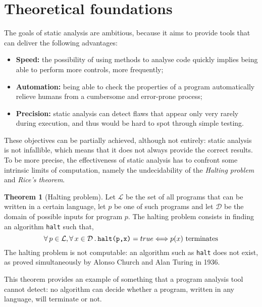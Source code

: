 \documentclass[12pt,a4paper]{book}
\newcommand{\st}{\hspace{2px}.\hspace{2px}}
\theoremstyle{definition}
\begin{document}
	\section{Theoretical foundations}
	The goals of static analysis are ambitious, because it aims to provide tools that can deliver the following advantages:
	\begin{itemize}
		\item \textbf{Speed:} the possibility of using methods to analyse code quickly implies being able to perform more controls, more frequently; 
		\item \textbf{Automation:} being able to check the properties of a program automatically relieve humans from a cumbersome and error-prone process;
		\item \textbf{Precision:} static analysis can detect flaws that appear only very rarely during execution, and thus would be hard to spot through simple testing.
	\end{itemize}
	These objectives can be partially achieved, although not entirely:  static analysis is not infallible, which means that it does not always provide the correct results. To be more precise, the effectiveness of static analysis has to confront some intrinsic limits of computation, namely the undecidability of the \textit{Halting problem} and \textit{Rice's theorem}. 
	\theoremstyle{theorem}
	\newtheorem{thm}{Theorem}
	\begin{thm}[Halting problem] Let $\mathcal{L}$ be the set of all programs that can be written in a certain language, let $p$ be one of such programs and let $\mathcal{D}$ be the domain of possible inputs for program $p$. The halting problem consists in finding an algorithm \texttt{halt} such that,  
		\[
		\forall\hspace{2px}p\in\mathcal{L}, \forall\hspace{2px}x \in \mathcal{D}\st\texttt{halt(p,x)} = true \Longleftrightarrow p(x)\text{ terminates}
		\]
		The halting problem is not computable: an algorithm such as \texttt{halt} does not exist, as proved simultaneously by Alonso Church \cite{Church1936} and Alan Turing \cite{Turing1937} in 1936.
	\end{thm}
	This theorem provides an example of something that a program analysis tool cannot detect: no algorithm can decide whether a program, written in any language, will terminate or not.
	
\end{document}
